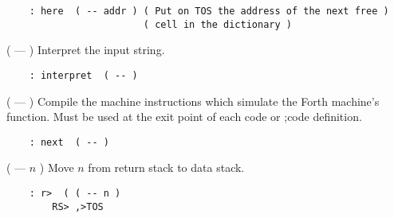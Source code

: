 \begin{lstlisting}
    : here  ( -- addr ) ( Put on TOS the address of the next free )
                        ( cell in the dictionary )
\end{lstlisting}

\hspace{2mm} ( --- ) Interpret the input string.
\begin{lstlisting}
    : interpret  ( -- )
\end{lstlisting}

\hspace{2mm} ( --- ) Compile the machine instructions which simulate the 
Forth machine's  function. Must be used at the exit point of each code or ;code
definition.
\begin{lstlisting}
    : next  ( -- )
\end{lstlisting}

\hspace{2mm} ( --- $n$ ) Move $n$ from return stack to data stack.
\begin{lstlisting}
    : r>  ( ( -- n )
        RS> ,>TOS
\end{lstlisting}

